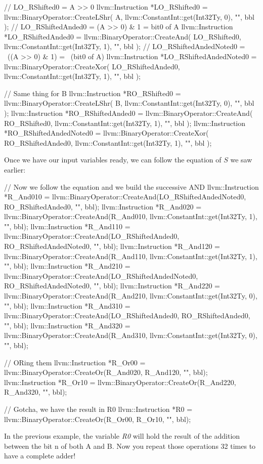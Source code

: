 \documentclass[a4paper, 11pt, notitlepage]{report}
\begin{document}
\begin{cppcode}
// LO_RShifted0 = A >> 0
llvm::Instruction *LO_RShifted0 = llvm::BinaryOperator::CreateLShr(
    A, llvm::ConstantInt::get(Int32Ty, 0),
    "", bbl
);
// LO_RShiftedAnded0 = (A >> 0) & 1 = bit0 of A
llvm::Instruction *LO_RShiftedAnded0 = llvm::BinaryOperator::CreateAnd(
    LO_RShifted0, llvm::ConstantInt::get(Int32Ty, 1),
    "", bbl
);
// LO_RShiftedAndedNoted0 = ~((A >> 0) & 1) = ~(bit0 of A)
llvm::Instruction *LO_RShiftedAndedNoted0 = llvm::BinaryOperator::CreateXor(
    LO_RShiftedAnded0, llvm::ConstantInt::get(Int32Ty, 1),
    "", bbl
);

// Same thing for B
llvm::Instruction *RO_RShifted0 = llvm::BinaryOperator::CreateLShr(
    B, llvm::ConstantInt::get(Int32Ty, 0),
    "", bbl
);
llvm::Instruction *RO_RShiftedAnded0 = llvm::BinaryOperator::CreateAnd(
    RO_RShifted0, llvm::ConstantInt::get(Int32Ty, 1),
    "", bbl
);
llvm::Instruction *RO_RShiftedAndedNoted0 = llvm::BinaryOperator::CreateXor(
    RO_RShiftedAnded0, llvm::ConstantInt::get(Int32Ty, 1),
    "", bbl
);
\end{cppcode}

Once we have our input variables ready, we can follow the equation of $S$ we saw earlier:

\begin{cppcode}
// Now we follow the equation and we build the successive AND
llvm::Instruction *R_And010 = llvm::BinaryOperator::CreateAnd(LO_RShiftedAndedNoted0, RO_RShiftedAnded0, "", bbl);
llvm::Instruction *R_And020 = llvm::BinaryOperator::CreateAnd(R_And010, llvm::ConstantInt::get(Int32Ty, 1), "", bbl);
llvm::Instruction *R_And110 = llvm::BinaryOperator::CreateAnd(LO_RShiftedAnded0, RO_RShiftedAndedNoted0, "", bbl);
llvm::Instruction *R_And120 = llvm::BinaryOperator::CreateAnd(R_And110, llvm::ConstantInt::get(Int32Ty, 1), "", bbl);
llvm::Instruction *R_And210 = llvm::BinaryOperator::CreateAnd(LO_RShiftedAndedNoted0, RO_RShiftedAndedNoted0, "", bbl);
llvm::Instruction *R_And220 = llvm::BinaryOperator::CreateAnd(R_And210, llvm::ConstantInt::get(Int32Ty, 0), "", bbl);
llvm::Instruction *R_And310 = llvm::BinaryOperator::CreateAnd(LO_RShiftedAnded0, RO_RShiftedAnded0, "", bbl);
llvm::Instruction *R_And320 = llvm::BinaryOperator::CreateAnd(R_And310, llvm::ConstantInt::get(Int32Ty, 0), "", bbl);

// ORing them
llvm::Instruction *R_Or00 = llvm::BinaryOperator::CreateOr(R_And020, R_And120, "", bbl);
llvm::Instruction *R_Or10 = llvm::BinaryOperator::CreateOr(R_And220, R_And320, "", bbl);

// Gotcha, we have the result in R0
llvm::Instruction *R0 = llvm::BinaryOperator::CreateOr(R_Or00, R_Or10, "", bbl);
\end{cppcode}
In the previous example, the variable \textit{R0} will hold the result of the addition between the bit  n of both A and B. Now you repeat those operations 32 times to have a complete adder!
\end{document}
